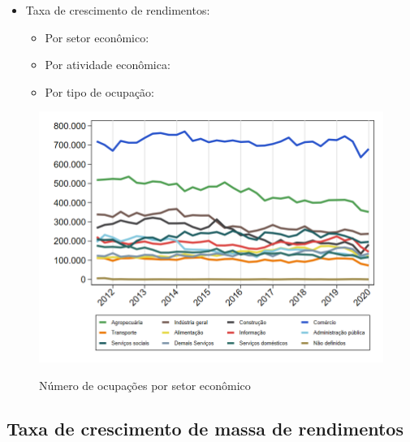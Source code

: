 \documentclass[8pt]{beamer}
\begin{document}
\begin{frame}[label=indice_principal_amz_jovem]{}
\begin{itemize}
\item{Taxa de crescimento de rendimentos:
	\begin{itemize}
	\item{Por setor econômico: \hyperlink{amzjovemrkngtxrendaporsetor}{}}
	\item{Por atividade econômica: \hyperlink{amzjovemrkngtxrendaporatividade}{}}
	\item{Por tipo de ocupação: \hyperlink{amzjovemrkngtxrendaporocupacao}{}}
	\end{itemize}
}
\vspace{1mm}

\end{itemize}

\end{frame}

\begin{frame}
\textit{\hyperlink{indice_principal_amz_jovem}{}}
\begin{figure}
  \centering
  \includegraphics[width=.85\linewidth]{./../analysis/output/_amz_jovem_importancia_relativa.png}
  \label{_amz_jovem_importancia_relativa}
  \caption{{Número de ocupações por setor econômico}}
\end{figure}
\end{frame}

\subsection{Taxa de crescimento de massa de rendimentos}

\begin{frame}
\textit{\hyperlink{indice_principal_amz_jovem}{}}

\end{frame}
\end{document}
